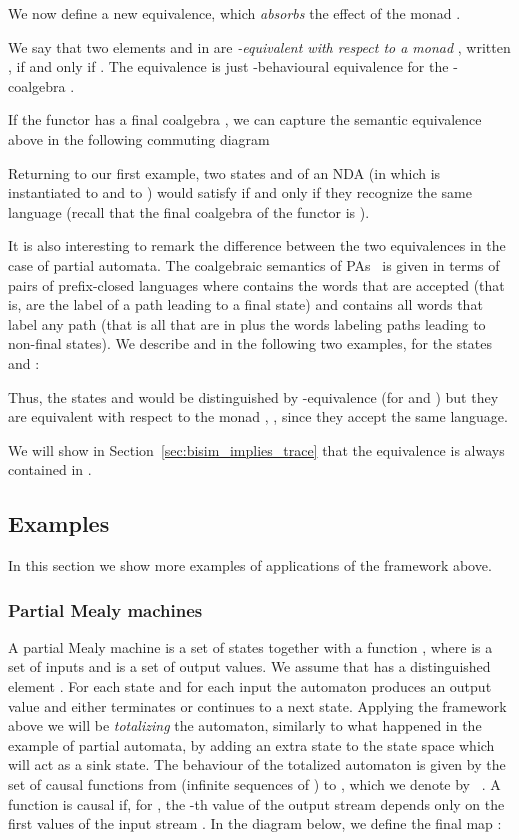 \documentclass{LMCS}
\begin{document}
We now define a new equivalence, which {\em absorbs} the effect of the monad .

We say that two elements  and  in  are
\emph{-equivalent with respect to a monad} , written , if and only if .
The equivalence  is just -behavioural equivalence for the
-coalgebra .

If the functor  has a final coalgebra   , we can capture the semantic equivalence above in the following commuting diagram

Returning to our first example, two states  and  of an NDA (in
which  is instantiated to  and  to
) would satisfy  if and
only if they recognize the same language (recall that the final
coalgebra of  the functor  is ).

It is also interesting to remark the difference between the two
equivalences in the case of partial automata.
The coalgebraic semantics of PAs~\cite{jan99} is given in terms of pairs of
prefix-closed languages  where  contains the
words that are accepted (that is, are the label of a path leading to
a final state) and  contains all words that label any path (that
is all that are in  plus the words labeling paths leading to
non-final states). We describe  and   in the
following two examples, for the states  and :

Thus, the states  and  would be distinguished by
-equivalence (for  and ) but they are
equivalent with respect to the monad , ,
since they accept the same language.

We will show in Section~\ref{sec:bisim_implies_trace} that the
equivalence  is always contained in .
\subsection{Examples}\label{sec:examples}
In this section we show more examples of applications of the
framework above.


\subsubsection{Partial Mealy machines}
A partial Mealy machine is a set of states  together with a
function , where  is a set of
inputs and  is a set of output values. We assume that
 has a distinguished element
. For each state  and for each input  the automaton
produces an output value and either terminates or continues to a
next state.  Applying the framework above we will be
\emph{totalizing} the automaton, similarly to what happened in the
example of partial automata, by adding an extra state to the state
space which will act as a sink state.  The behaviour of the
totalized automaton is given by the set of causal functions from
 (infinite sequences of ) to , which we
denote by ~\cite{jan_mealy}. A function
 is causal if, for , the -th value of the output stream  depends
only on the first  values of the input stream .
In the diagram below, we define the final map
:
\end{document}
